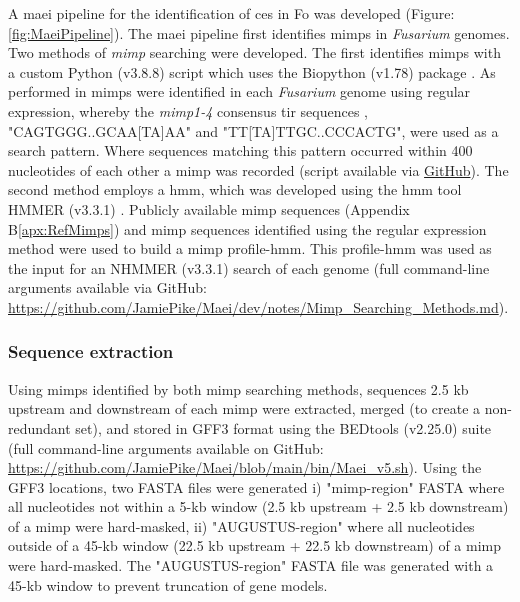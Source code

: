 A \acf{maei} pipeline for the identification of \acp{ce} in \ac{Fo} was developed (Figure: \ref{fig:MaeiPipeline}). The \ac{maei} pipeline first identifies \acp{mimp} in \textit{Fusarium} genomes. Two methods of \textit{mimp} searching were developed. The first identifies \acp{mimp} with a custom Python (v3.8.8) script \parencite{Python} which uses the Biopython (v1.78) package \parencite{biopython}. As performed in \textcite{Schmidt2013, Dam2016, Armitage2018} \acp{mimp} were identified in each \textit{Fusarium} genome using regular expression, whereby the \textit{mimp1-4} consensus \ac{tir} sequences \parencite{Bergemann2008, Schmidt2013}, "CAGTGGG..GCAA[TA]AA" and "TT[TA]TTGC..CCCACTG", were used as a search pattern. Where sequences matching this pattern occurred within 400 nucleotides of each other a \ac{mimp} was recorded (script available via \href{https://github.com/JamiePike/Maei/blob/main/bin/Mimp_finditer.py}{GitHub}). The second method employs a \acf{hmm}, which was developed using the \ac{hmm} tool HMMER (v3.3.1) \parencite{Eddy2011}. Publicly available \ac{mimp} sequences (Appendix B\ref{apx:RefMimps}) and \ac{mimp} sequences identified using the regular expression method were used to build a \ac{mimp} profile-\ac{hmm}. This profile-\ac{hmm} was used as the input for an NHMMER (v3.3.1) \parencite{Eddy2011} search of each genome (full command-line arguments available via GitHub: \href{https://github.com/JamiePike/Maei/blob/main/dev/notes/Mimp_Searching_Methods.md}{https://github.com/JamiePike/Maei/dev/notes/M\-imp\_Searching\_Methods.md}).

\subsubsection{Sequence extraction}

Using \acp{mimp} identified by both \ac{mimp} searching methods, sequences 2.5 kb upstream and downstream of each \ac{mimp} were extracted, merged (to create a non-redundant set), and stored in GFF3 format using the BEDtools (v2.25.0) suite \parencite{Quinlan2010} (full command-line arguments available on GitHub: \href{https://github.com/JamiePike/Maei/blob/main/bin/Maei_v5.sh}{https://github.com/JamiePike/Maei/bl\-ob/main/bin/Maei\_v5.sh}). Using the GFF3 locations, two FASTA files were generated i) "\ac{mimp}-region" FASTA where all nucleotides not within a 5-kb window (2.5 kb upstream + 2.5 kb downstream) of a \ac{mimp} were hard-masked, ii) "AUGUSTUS-region" where all nucleotides outside of a 45-kb window (22.5 kb upstream + 22.5 kb downstream) of a \ac{mimp} were hard-masked. The "AUGUSTUS-region" FASTA file was generated with a 45-kb window to prevent truncation of gene models. 

